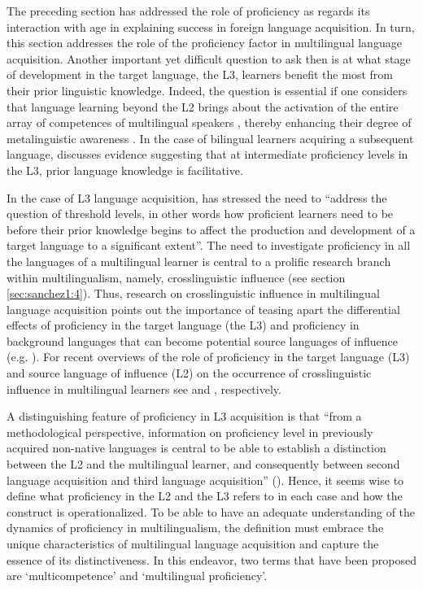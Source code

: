\documentclass[output=paper,colorlinks,citecolor=brown,nonflat]{langsci/langscibook}
\begin{document}
The preceding section has addressed the role of proficiency as regards its interaction with age in explaining success in foreign language acquisition. In turn, this section addresses the role of the proficiency factor in multilingual language acquisition. Another important yet difficult question to ask then is at what stage of development in the target language, the L3, learners benefit the most from their prior linguistic knowledge. Indeed, the question is essential if one considers that language learning beyond the L2 brings about the activation of the entire array of competences of multilingual speakers \citep{Coste1997}, thereby enhancing their degree of metalinguistic awareness \citep{Jessner2008Knowledge}. In the case of bilingual learners acquiring a subsequent language, \citet{Cenoz2013} discusses evidence suggesting that at intermediate proficiency levels in the L3, prior language knowledge is facilitative.

In the case of L3 language acquisition, \citet[34]{DeAngelis2007} has stressed the need to “address the question of threshold levels, in other words how proficient learners need to be before their prior knowledge begins to affect the production and development of a target language to a significant extent”. The need to investigate proficiency in all the languages of a multilingual learner is central to a prolific research branch within multilingualism, namely, crosslinguistic influence (see section \ref{sec:sanchez1:4}). Thus, research on crosslinguistic influence in multilingual language acquisition points out the importance of teasing apart the differential effects of proficiency in the target language (the L3) and proficiency in background languages that can become potential source languages of influence (e.g. \citealt{BardelLindqvist2007, DeAngelis2007, FalkBardel2010, Jaensch2011, LindqvistBardel2013, SánchezBardel2016}). For recent overviews of the role of proficiency in the target language (L3) and source language of influence (L2) on the occurrence of crosslinguistic influence in multilingual learners see \citet{Sánchez2014} and \citet{SánchezBardel2017}, respectively.

A distinguishing feature of proficiency in L3 acquisition is that “from a methodological perspective, information on proficiency level in previously acquired non-native languages is central to be able to establish a distinction between the L2 and the multilingual learner, and consequently between second language acquisition and third language acquisition” (\citealt[34]{DeAngelis2007}). Hence, it seems wise to define what proficiency in the L2 and the L3 refers to in each case and how the construct is operationalized. To be able to have an adequate understanding of the dynamics of proficiency in multilingualism, the definition must embrace the unique characteristics of multilingual language acquisition and capture the essence of its distinctiveness. In this endeavor, two terms that have been proposed are ‘multicompetence’ \citep{Cook1995} and ‘multilingual proficiency’.
\end{document}
